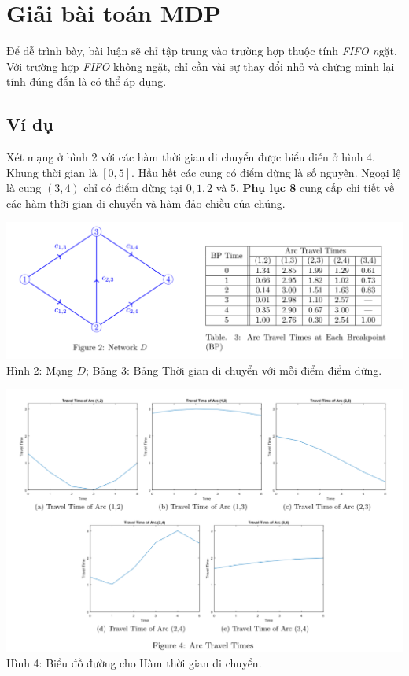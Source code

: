 \documentclass[14pt,oneside]{scrbook}
\begin{document}
\frontmatter
\pagestyle{empty}
\mainmatter
\pagestyle{fancy}
\chapter{Giải bài toán MDP}\label{giux1ea3i-buxe0i-touxe1n-mdp}

Để dễ trình bày, bài luận sẽ chỉ tập trung vào trường hợp thuộc tính
\emph{FIFO n}gặt. Với trường hợp \emph{FIFO} không ngặt, chỉ cần vài sự
thay đổi nhỏ và chứng minh lại tính đúng đắn là có thể áp dụng.

\section{Ví dụ}\label{vuxed-dux1ee5}

Xét mạng ở hình 2 với các hàm thời gian di chuyển được biểu diễn ở hình
4. Khung thời gian là \([0, 5]\). Hầu hết các cung có điểm dừng là số
nguyên. Ngoại lệ là cung \((3, 4)\) chỉ có điểm dừng tại \(0, 1, 2\) và
\(5\). \textbf{Phụ lục 8} cung cấp chi tiết về các hàm thời gian di
chuyển và hàm đảo chiều của chúng.

\includegraphics{images/Figure2.png}Hình 2: Mạng \(D\); Bảng 3: Bảng
Thời gian di chuyển với mỗi điểm điểm dừng.

\includegraphics{images/Figure4.png} Hình 4: Biểu đồ đường cho Hàm thời
gian di chuyển.
\end{document}
